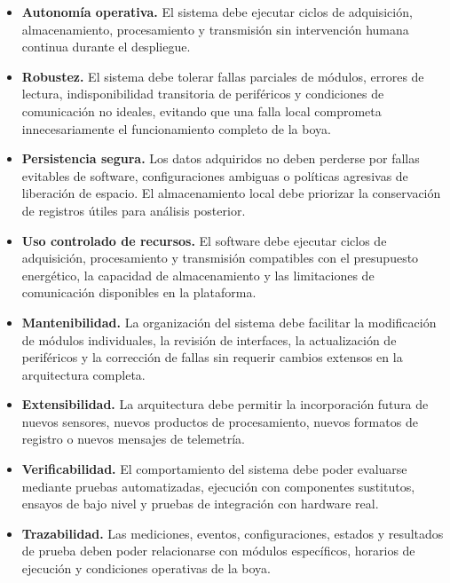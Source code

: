 \begin{itemize}
    \item \textbf{Autonomía operativa.} El sistema debe ejecutar ciclos de adquisición, almacenamiento, procesamiento y transmisión sin intervención humana continua durante el despliegue.

    \item \textbf{Robustez.} El sistema debe tolerar fallas parciales de módulos, errores de lectura, indisponibilidad transitoria de periféricos y condiciones de comunicación no ideales, evitando que una falla local comprometa innecesariamente el funcionamiento completo de la boya.

    \item \textbf{Persistencia segura.} Los datos adquiridos no deben perderse por fallas evitables de software, configuraciones ambiguas o políticas agresivas de liberación de espacio. El almacenamiento local debe priorizar la conservación de registros útiles para análisis posterior.

    \item \textbf{Uso controlado de recursos.} El software debe ejecutar ciclos de adquisición, procesamiento y transmisión compatibles con el presupuesto energético, la capacidad de almacenamiento y las limitaciones de comunicación disponibles en la plataforma.

    \item \textbf{Mantenibilidad.} La organización del sistema debe facilitar la modificación de módulos individuales, la revisión de interfaces, la actualización de periféricos y la corrección de fallas sin requerir cambios extensos en la arquitectura completa.

    \item \textbf{Extensibilidad.} La arquitectura debe permitir la incorporación futura de nuevos sensores, nuevos productos de procesamiento, nuevos formatos de registro o nuevos mensajes de telemetría.

    \item \textbf{Verificabilidad.} El comportamiento del sistema debe poder evaluarse mediante pruebas automatizadas, ejecución con componentes sustitutos, ensayos de bajo nivel y pruebas de integración con hardware real.

    \item \textbf{Trazabilidad.} Las mediciones, eventos, configuraciones, estados y resultados de prueba deben poder relacionarse con módulos específicos, horarios de ejecución y condiciones operativas de la boya.
\end{itemize}

